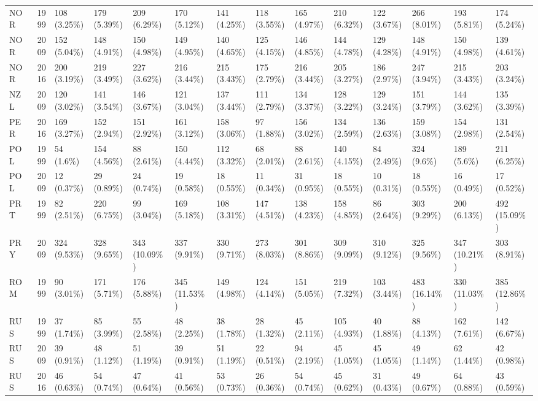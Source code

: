 \documentclass[]{article}
\begin{document}
\begin{longtable}[]{@{}lrllllllllllll@{}}
NOR & 1999 & 108 (3.25\%) & 179 (5.39\%) & 209 (6.29\%) & 170 (5.12\%) &
141 (4.25\%) & 118 (3.55\%) & 165 (4.97\%) & 210 (6.32\%) & 122 (3.67\%)
& 266 (8.01\%) & 193 (5.81\%) & 174 (5.24\%)\tabularnewline
NOR & 2009 & 152 (5.04\%) & 148 (4.91\%) & 150 (4.98\%) & 149 (4.95\%) &
140 (4.65\%) & 125 (4.15\%) & 146 (4.85\%) & 144 (4.78\%) & 129 (4.28\%)
& 148 (4.91\%) & 150 (4.98\%) & 139 (4.61\%)\tabularnewline
NOR & 2016 & 200 (3.19\%) & 219 (3.49\%) & 227 (3.62\%) & 216 (3.44\%) &
215 (3.43\%) & 175 (2.79\%) & 216 (3.44\%) & 205 (3.27\%) & 186 (2.97\%)
& 247 (3.94\%) & 215 (3.43\%) & 203 (3.24\%)\tabularnewline
NZL & 2009 & 120 (3.02\%) & 141 (3.54\%) & 146 (3.67\%) & 121 (3.04\%) &
137 (3.44\%) & 111 (2.79\%) & 134 (3.37\%) & 128 (3.22\%) & 129 (3.24\%)
& 151 (3.79\%) & 144 (3.62\%) & 135 (3.39\%)\tabularnewline
PER & 2016 & 169 (3.27\%) & 152 (2.94\%) & 151 (2.92\%) & 161 (3.12\%) &
158 (3.06\%) & 97 (1.88\%) & 156 (3.02\%) & 134 (2.59\%) & 136 (2.63\%)
& 159 (3.08\%) & 154 (2.98\%) & 131 (2.54\%)\tabularnewline
POL & 1999 & 54 (1.6\%) & 154 (4.56\%) & 88 (2.61\%) & 150 (4.44\%) &
112 (3.32\%) & 68 (2.01\%) & 88 (2.61\%) & 140 (4.15\%) & 84 (2.49\%) &
324 (9.6\%) & 189 (5.6\%) & 211 (6.25\%)\tabularnewline
POL & 2009 & 12 (0.37\%) & 29 (0.89\%) & 24 (0.74\%) & 19 (0.58\%) & 18
(0.55\%) & 11 (0.34\%) & 31 (0.95\%) & 18 (0.55\%) & 10 (0.31\%) & 18
(0.55\%) & 16 (0.49\%) & 17 (0.52\%)\tabularnewline
PRT & 1999 & 82 (2.51\%) & 220 (6.75\%) & 99 (3.04\%) & 169 (5.18\%) &
108 (3.31\%) & 147 (4.51\%) & 138 (4.23\%) & 158 (4.85\%) & 86 (2.64\%)
& 303 (9.29\%) & 200 (6.13\%) & 492 (15.09\%)\tabularnewline
PRY & 2009 & 324 (9.53\%) & 328 (9.65\%) & 343 (10.09\%) & 337 (9.91\%)
& 330 (9.71\%) & 273 (8.03\%) & 301 (8.86\%) & 309 (9.09\%) & 310
(9.12\%) & 325 (9.56\%) & 347 (10.21\%) & 303 (8.91\%)\tabularnewline
ROM & 1999 & 90 (3.01\%) & 171 (5.71\%) & 176 (5.88\%) & 345 (11.53\%) &
149 (4.98\%) & 124 (4.14\%) & 151 (5.05\%) & 219 (7.32\%) & 103 (3.44\%)
& 483 (16.14\%) & 330 (11.03\%) & 385 (12.86\%)\tabularnewline
RUS & 1999 & 37 (1.74\%) & 85 (3.99\%) & 55 (2.58\%) & 48 (2.25\%) & 38
(1.78\%) & 28 (1.32\%) & 45 (2.11\%) & 105 (4.93\%) & 40 (1.88\%) & 88
(4.13\%) & 162 (7.61\%) & 142 (6.67\%)\tabularnewline
RUS & 2009 & 39 (0.91\%) & 48 (1.12\%) & 51 (1.19\%) & 39 (0.91\%) & 51
(1.19\%) & 22 (0.51\%) & 94 (2.19\%) & 45 (1.05\%) & 45 (1.05\%) & 49
(1.14\%) & 62 (1.44\%) & 42 (0.98\%)\tabularnewline
RUS & 2016 & 46 (0.63\%) & 54 (0.74\%) & 47 (0.64\%) & 41 (0.56\%) & 53
(0.73\%) & 26 (0.36\%) & 54 (0.74\%) & 45 (0.62\%) & 31 (0.43\%) & 49
(0.67\%) & 64 (0.88\%) & 43 (0.59\%)\tabularnewline

\end{longtable}
\end{document}
